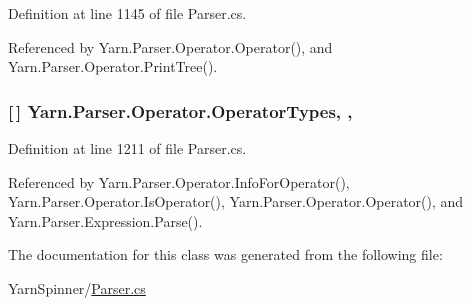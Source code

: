 Definition at line 1145 of file Parser.\-cs.



Referenced by Yarn.\-Parser.\-Operator.\-Operator(), and Yarn.\-Parser.\-Operator.\-Print\-Tree().

\hypertarget{a00137_ad8a4bb1b46dbc3d1b7708e78a2d97e1c}{
\subsubsection[{Operator\-Types}]{ \mbox{[}$\,$\mbox{]} Yarn.\-Parser.\-Operator.\-Operator\-Types\hspace{0.3cm}{\ttfamily [static]}, {\ttfamily [get]}, {\ttfamily [package]}}}\label{a00137_ad8a4bb1b46dbc3d1b7708e78a2d97e1c}


Definition at line 1211 of file Parser.\-cs.



Referenced by Yarn.\-Parser.\-Operator.\-Info\-For\-Operator(), Yarn.\-Parser.\-Operator.\-Is\-Operator(), Yarn.\-Parser.\-Operator.\-Operator(), and Yarn.\-Parser.\-Expression.\-Parse().



The documentation for this class was generated from the following file\-:\begin{DoxyCompactItemize}
\item 
Yarn\-Spinner/\hyperlink{a00301}{Parser.\-cs}\end{DoxyCompactItemize}
